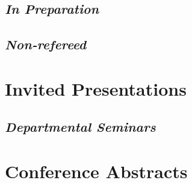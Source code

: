 \documentclass[11pt,a4paper,sans]{moderncv}        %
\begin{document}
\subsection{\textit{In Preparation}}%
\renewcommand*{\bibliographyhead}[1]{\subsection{In Preparation}}

\renewcommand*{\bibliographyhead}[1]{\subsection{Non-refereed}}
\subsection{\textit{Non-refereed}}

\section{Invited Presentations}
\renewcommand*{\bibliographyhead}[1]{}

\renewcommand*{\bibliographyhead}[1]{\subsection{Departmental Seminars}}
\subsection{\textit{Departmental Seminars}}

\section{Conference Abstracts}
\renewcommand*{\bibliographyhead}[1]{}

\end{document}
